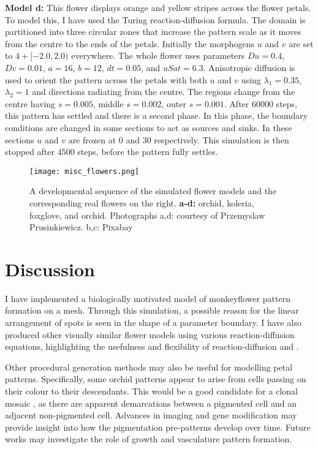\textbf{Model d:}
This flower displays orange and yellow stripes across the flower petals. To model this, I have used the Turing reaction-diffusion formula. The domain is partitioned into three circular zones that increase the pattern scale as it moves from the centre to the ends of the petals. Initially the morphogens $u$ and $v$ are set to $4 + [-2.0, 2.0)$ everywhere. The whole flower uses parameters $Du=0.4$, $Dv=0.01$, $a=16$, $b=12$, $dt=0.05$, and $uSat=6.3$. Anisotropic diffusion is used to orient the pattern across the petals with both $u$ and $v$ using $\lambda_1=0.35$, $\lambda_2=1$ and directions radiating from the centre. The regions change from the centre having $s=0.005$, middle $s=0.002$, outer $s=0.001$. After $60000$ steps, this pattern has settled and there is a second phase. In this phase, the boundary conditions are changed in some sections to act as sources and sinks. In these sections $u$ and $v$ are frozen at $0$ and $30$ respectively. This simulation is then stopped after $4500$ steps, before the pattern fully settles.

\begin{figure}[p]
	\centering
	\texttt{[image: misc\_flowers.png]}
	\caption{A developmental sequence of the simulated flower models and the corresponding real flowers on the right. \textbf{a-d:} orchid, koleria, foxglove, and orchid. \textcolor{citation-gray}{Photographs a,d: courtesy of Przemyslaw Prusinkiewicz. b,c: Pixabay}}
	\label{fig:miscFlowers}
\end{figure}

\section{Discussion}

I have implemented a biologically motivated model of monkeyflower pattern formation on a mesh. Through this simulation, a possible reason for the linear arrangement of spots is seen in the shape of a parameter boundary. I have also produced other visually similar flower models using various reaction-diffusion equations, highlighting the usefulness and flexibility of reaction-diffusion and \ProgramName{}.

Other procedural generation methods may also be useful for modelling petal patterns. Specifically, some orchid patterns appear to arise from cells passing on their colour to their descendants. This would be a good candidate for a clonal mosaic \citep{korn2007}, as there are apparent demarcations between a pigmented cell and an adjacent non-pigmented cell. Advances in imaging and gene modification may provide insight into how the pigmentation pre-patterns develop over time. Future works may investigate the role of growth and vasculature pattern formation.